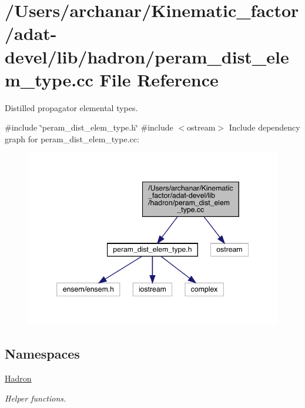 \hypertarget{adat-devel_2lib_2hadron_2peram__dist__elem__type_8cc}{}\section{/\+Users/archanar/\+Kinematic\+\_\+factor/adat-\/devel/lib/hadron/peram\+\_\+dist\+\_\+elem\+\_\+type.cc File Reference}
\label{adat-devel_2lib_2hadron_2peram__dist__elem__type_8cc}


Distilled propagator elemental types.  


{\ttfamily \#include \char`\"{}peram\+\_\+dist\+\_\+elem\+\_\+type.\+h\char`\"{}}\newline
{\ttfamily \#include $<$ostream$>$}\newline
Include dependency graph for peram\+\_\+dist\+\_\+elem\+\_\+type.\+cc\+:
\nopagebreak
\begin{figure}[H]
\begin{center}
\leavevmode
\includegraphics[width=346pt]{db/d92/adat-devel_2lib_2hadron_2peram__dist__elem__type_8cc__incl}
\end{center}
\end{figure}
\subsection*{Namespaces}
\begin{DoxyCompactItemize}
\item 
 \mbox{\hyperlink{namespaceHadron}{Hadron}}
\begin{DoxyCompactList}\small\item\em Helper functions. \end{DoxyCompactList}\end{DoxyCompactItemize}
